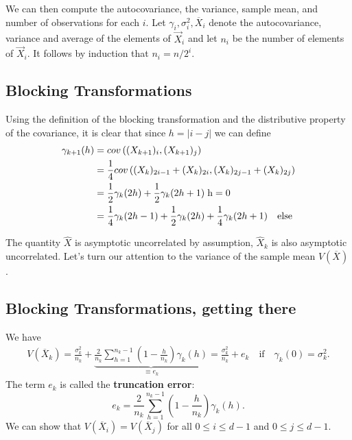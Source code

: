 \documentclass[%
oneside,                 %
final,                   %
10pt]{article}
\begin{document}
We can then compute the autocovariance, the variance, sample mean, and
number of observations for each $i$. 
Let $\gamma_i, \sigma_i^2,
\overline{X}_i$ denote the autocovariance, variance and average of the
elements of $\vec{X}_i$ and let $n_i$ be the number of elements of
$\vec{X}_i$. It follows by induction that $n_i = n/2^i$. 

\subsection*{Blocking Transformations}

Using the
definition of the blocking transformation and the distributive
property of the covariance, it is clear that since $h =|i-j|$
we can define
\begin{align}
\gamma_{k+1}(h) &= cov\left( ({X}_{k+1})_{i}, ({X}_{k+1})_{j} \right) \nonumber \\
&=  \frac{1}{4}cov\left( ({X}_{k})_{2i-1} + ({X}_{k})_{2i}, ({X}_{k})_{2j-1} + ({X}_{k})_{2j} \right) \nonumber \\
&=  \frac{1}{2}\gamma_{k}(2h) + \frac{1}{2}\gamma_k(2h+1) \hspace{0.1cm} \mathrm{h = 0} \\
&=\frac{1}{4}\gamma_k(2h-1) + \frac{1}{2}\gamma_k(2h) + \frac{1}{4}\gamma_k(2h+1) \quad \mathrm{else}
\end{align}

The quantity $\hat{X}$ is asymptotic uncorrelated by assumption, $\hat{X}_k$ is also asymptotic uncorrelated. Let's turn our attention to the variance of the sample mean $V(\overline{X})$. 

\subsection*{Blocking Transformations, getting there}
We have
\begin{align}
V(\overline{X}_k) = \frac{\sigma_k^2}{n_k} + \underbrace{\frac{2}{n_k} \sum_{h=1}^{n_k-1}\left( 1 - \frac{h}{n_k} \right)\gamma_k(h)}_{\equiv e_k} = \frac{\sigma^2_k}{n_k} + e_k \quad \text{if} \quad \gamma_k(0) = \sigma_k^2. 
\end{align}
The term $e_k$ is called the \textbf{truncation error}: 
\begin{equation}
e_k = \frac{2}{n_k} \sum_{h=1}^{n_k-1}\left( 1 - \frac{h}{n_k} \right)\gamma_k(h). 
\end{equation}
We can show that $V(\overline{X}_i) = V(\overline{X}_j)$ for all $0 \leq i \leq d-1$ and $0 \leq j \leq d-1$. 
\end{document}
